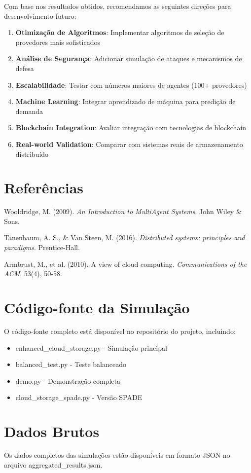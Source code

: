 \documentclass[12pt,a4paper]{article}
\begin{document}
Com base nos resultados obtidos, recomendamos as seguintes direções para desenvolvimento futuro:

\begin{enumerate}
    \item \textbf{Otimização de Algoritmos}: Implementar algoritmos de seleção de provedores mais sofisticados
    \item \textbf{Análise de Segurança}: Adicionar simulação de ataques e mecanismos de defesa
    \item \textbf{Escalabilidade}: Testar com números maiores de agentes (100+ provedores)
    \item \textbf{Machine Learning}: Integrar aprendizado de máquina para predição de demanda
    \item \textbf{Blockchain Integration}: Avaliar integração com tecnologias de blockchain
    \item \textbf{Real-world Validation}: Comparar com sistemas reais de armazenamento distribuído
\end{enumerate}

\section{Referências}

\begin{thebibliography}{9}
Wooldridge, M. (2009). 
\textit{An Introduction to MultiAgent Systems}. 
John Wiley \& Sons.

Tanenbaum, A. S., \& Van Steen, M. (2016).
\textit{Distributed systems: principles and paradigms}.
Prentice-Hall.

Armbrust, M., et al. (2010).
A view of cloud computing.
\textit{Communications of the ACM}, 53(4), 50-58.
\end{thebibliography}

\appendix
\section{Código-fonte da Simulação}

O código-fonte completo está disponível no repositório do projeto, incluindo:
\begin{itemize}
    \item enhanced\_cloud\_storage.py - Simulação principal
    \item balanced\_test.py - Teste balanceado
    \item demo.py - Demonstração completa
    \item cloud\_storage\_spade.py - Versão SPADE
\end{itemize}

\section{Dados Brutos}

Os dados completos das simulações estão disponíveis em formato JSON no arquivo aggregated\_results.json.
\end{document}
